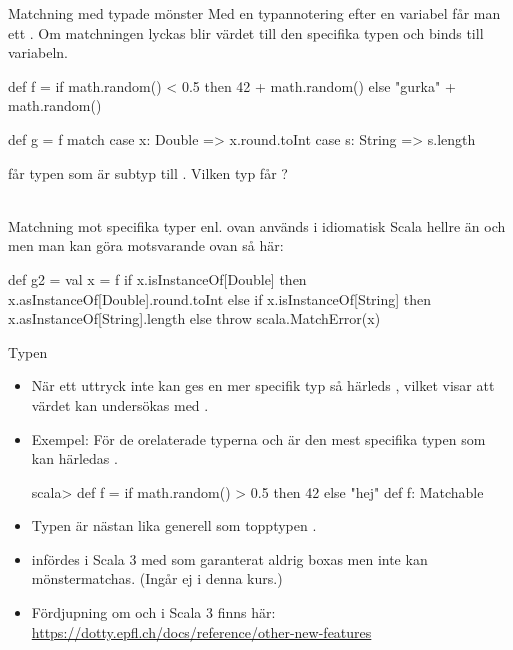 \begin{Slide}{Matchning med typade mönster}\SlideFontSmall
Med en typannotering efter en variabel får man ett  . Om matchningen lyckas blir värdet  till den specifika typen och binds till variabeln.
\begin{Code}
def f = 
  if math.random() < 0.5 then 42 + math.random() 
  else "gurka" + math.random()

def g = f match 
  case x: Double => x.round.toInt
  case s: String => s.length
\end{Code}
 får typen  som är subtyp till . Vilken typ får ? \pause ~~
{\SlideFontTiny \\\vspace{0.5em} Matchning mot specifika typer enl. ovan används i idiomatisk Scala hellre än  och  men man kan göra motsvarande ovan så här:
\begin{Code}
def g2 =  
  val x = f
  if x.isInstanceOf[Double] then x.asInstanceOf[Double].round.toInt
  else if x.isInstanceOf[String] then x.asInstanceOf[String].length
  else throw scala.MatchError(x)
\end{Code}
}
\end{Slide}

\begin{Slide}{Typen }
\begin{itemize}\SlideFontSmall
\item
När ett uttryck inte kan ges en mer specifik typ så härleds , vilket visar att värdet kan undersökas med .
\item Exempel: För de orelaterade typerna  och  är den mest specifika typen som kan härledas .

\begin{REPLsmall}
scala> def f = if math.random() > 0.5 then 42 else "hej"
def f: Matchable
\end{REPLsmall}

\item Typen  är nästan lika generell som topptypen . 
\item {} infördes i Scala 3 med  som garanterat aldrig boxas men inte kan mönstermatchas. (Ingår ej i denna kurs.)
\item Fördjupning om  och  i Scala 3 finns här:
\\\url{https://dotty.epfl.ch/docs/reference/other-new-features}
\end{itemize}
\end{Slide}

